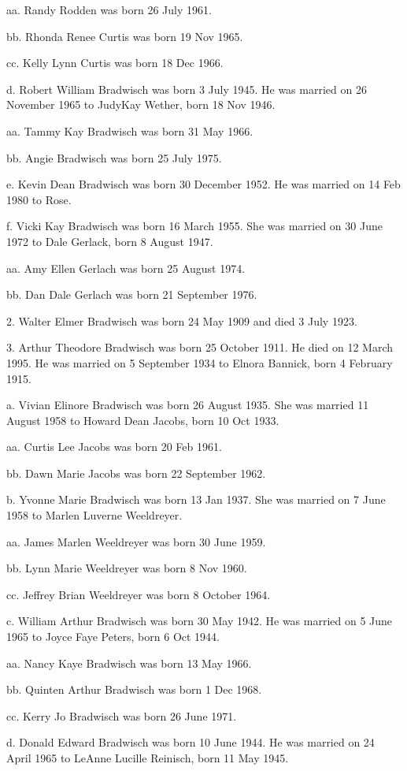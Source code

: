 \documentclass[a4paper]{article}
\begin{document}
aa. Randy Rodden was born 26 July 1961. 

bb. Rhonda Renee  Curtis was born 19 Nov 1965.

cc. Kelly Lynn Curtis was born 18 Dec 1966.

d. Robert William Bradwisch was born 3 July 1945.  He was married on 26 November 1965 to JudyKay Wether, born 18 Nov 1946.
 
aa. Tammy Kay Bradwisch was born 31 May 1966.

bb. Angie Bradwisch was born 25 July 1975.

e. Kevin Dean Bradwisch was born 30 December 1952.  He was married on 14 Feb 1980 to Rose.

f. Vicki Kay Bradwisch was born 16 March 1955.  She was married on 30 June 1972 to Dale Gerlack, born 8 August 1947.
 
aa. Amy Ellen Gerlach was born 25 August 1974.

bb. Dan Dale Gerlach was born 21 September 1976.

2. Walter Elmer Bradwisch was born 24 May 1909 and died 3 July 1923.

3. Arthur Theodore Bradwisch was born 25 October 1911.  He died on 12 March 1995. He was married on 5 September 1934 to Elnora Bannick, born 4 February 1915.

a. Vivian Elinore Bradwisch was born 26 August 1935.  She was married 11 August 1958 to Howard Dean Jacobs, born 10 Oct 1933.

aa. Curtis Lee Jacobs was born 20 Feb 1961.

bb. Dawn Marie Jacobs was born 22 September 1962.

b. Yvonne Marie Bradwisch was born 13 Jan 1937.  She was married on 7 June 1958 to Marlen Luverne Weeldreyer.
 
aa. James Marlen Weeldreyer was born 30 June 1959.

bb. Lynn Marie Weeldreyer was born 8 Nov 1960.

cc. Jeffrey Brian Weeldreyer was born 8 October 1964.

c. William Arthur Bradwisch was born 30 May 1942.  He was married on 5 June 1965 to Joyce Faye Peters, born 6 Oct 1944.

aa. Nancy Kaye Bradwisch was born 13 May 1966.

bb. Quinten Arthur Bradwisch was born 1 Dec 1968.

cc. Kerry Jo Bradwisch was born 26 June 1971.

d. Donald Edward Bradwisch was born 10 June 1944.  He was married on 24 April 1965 to LeAnne Lucille Reinisch, born 11 May 1945.
 
\end{document}

